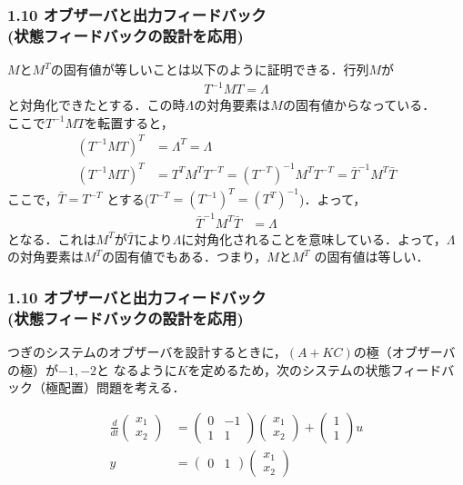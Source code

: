 \begin{frame}[t]
\frametitle{1.10 オブザーバと出力フィードバック \\
(状態フィードバックの設計を応用)}
$M$と$M^T$の固有値が等しいことは以下のように証明できる．行列$M$が
\begin{align}
   T^{-1}MT = \Lambda
\end{align}
と対角化できたとする．この時$\Lambda$の対角要素は$M$の固有値からなっている．\\
ここで$T^{-1}MT$を転置すると，
\begin{align}
   (T^{-1}MT)^T &=  \Lambda^T = \Lambda
\\
   (T^{-1}MT)^T &= T^T M^T T^{-T} = (T^{-T})^{-1} M^T T^{-T} = \bar{T}^{-1} M^T \bar{T}
\end{align}
ここで，$\bar{T} = T^{-T}$ とする($T^{-T} = (T^{-1})^T=(T^T)^{-1}$)．よって，
\begin{align}
   \bar{T}^{-1} M^T \bar{T} &=  \Lambda
\end{align}
となる．これは$M^{T}$が$\bar{T}$により$\Lambda$に対角化されることを意味している．よって，$\Lambda$の対角要素は$M^{T}$の固有値でもある．つまり，$M$と$M^{T}$
の固有値は等しい．
\end{frame}


\begin{frame}[t]
\frametitle{1.10 オブザーバと出力フィードバック \\
(状態フィードバックの設計を応用)}
つぎのシステムのオブザーバを設計するときに，$(A+KC)$の極（オブザーバの極）が$-1,-2$と
なるように$K$を定めるため，次のシステムの状態フィードバック（極配置）問題を考える．

\begin{align}
 \frac{d}{dt}
 \left(
 \begin{array}{c}
  x_1 \\
  x_2
 \end{array}
 \right)
 &=
 \left(
 \begin{array}{cc}
  0 & -1 \\
  1 & 1
 \end{array}
 \right)
 \left(
 \begin{array}{c}
  x_1 \\
  x_2
 \end{array}
 \right) +
 \left(
 \begin{array}{c}
  1 \\
  1
 \end{array}
 \right) u \\
 y &=
 \left(
 \begin{array}{cc}
  0 & 1
 \end{array}
 \right)
 \left(
 \begin{array}{c}
  x_1 \\
  x_2
 \end{array}
 \right)
\end{align}
\end{frame}


